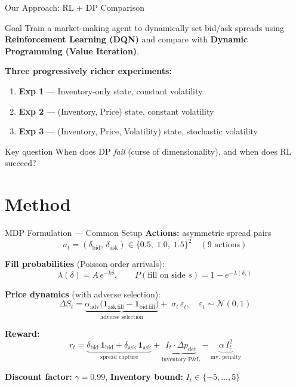 \documentclass[aspectratio=169]{beamer}
\newcommand{\1}{\mathbf{1}}
\newcommand{\dB}{\delta_{\mathrm{bid}}}
\newcommand{\dA}{\delta_{\mathrm{ask}}}
\begin{document}
\begin{frame}{Our Approach: RL + DP Comparison}
  \begin{block}{Goal}
    Train a market-making agent to dynamically set bid/ask spreads using\\
    \textbf{Reinforcement Learning (DQN)} and compare with \textbf{Dynamic Programming (Value Iteration)}.
  \end{block}

  \vspace{0.5em}
  \textbf{Three progressively richer experiments:}
  \begin{enumerate}
    \item \textbf{Exp 1} — Inventory-only state, constant volatility
    \item \textbf{Exp 2} — (Inventory, Price) state, constant volatility
    \item \textbf{Exp 3} — (Inventory, Price, Volatility) state, stochastic volatility
  \end{enumerate}

  \vspace{0.5em}
  \begin{alertblock}{Key question}
    When does DP \emph{fail} (curse of dimensionality), and when does RL succeed?
  \end{alertblock}
\end{frame}

\section{Method}

\begin{frame}{MDP Formulation — Common Setup}
  \textbf{Actions:} asymmetric spread pairs
  \[
    a_t = (\dB,\, \dA) \in \{0.5,\; 1.0,\; 1.5\}^2 \quad (9 \text{ actions})
  \]

  \textbf{Fill probabilities} (Poisson order arrivals):
  \[
    \lambda(\delta) = A\,e^{-k\delta}, \qquad
    P(\text{fill on side } s) = 1 - e^{-\lambda(\delta_s)}
  \]

  \textbf{Price dynamics} (with adverse selection):
  \[
    \Delta S_t = \underbrace{\alpha_{\mathrm{adv}}\bigl(\1_{\mathrm{ask\,fill}} - \1_{\mathrm{bid\,fill}}\bigr)}_{\text{adverse selection}} + \;\sigma_t\,\varepsilon_t, \quad \varepsilon_t \sim \mathcal{N}(0,1)
  \]

  \textbf{Reward:}
  \[
    r_t = \underbrace{\dB\,\1_{\mathrm{bid}} + \dA\,\1_{\mathrm{ask}}}_{\text{spread capture}}
          + \underbrace{I_t \cdot \Delta p_{\mathrm{det}}}_{\text{inventory P\&L}}
          - \underbrace{\alpha\, I_t^2}_{\text{inv.\ penalty}}
  \]

  \textbf{Discount factor:} $\gamma = 0.99$, \textbf{Inventory bound:} $I_t \in \{-5,\ldots,5\}$
\end{frame}
\end{document}
